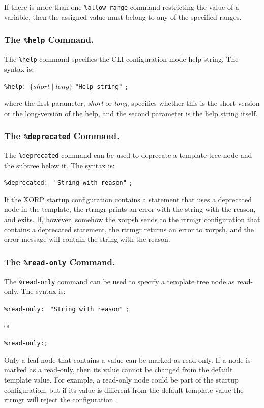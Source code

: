 \documentclass[11pt]{article}
\begin{document}
If there is more than one {\tt \%allow-range} command restricting
the value of a variable, then the assigned value must belong to any
of the specified ranges.

\subsubsection{The {\tt \%help} Command.}

The {\tt \%help} command specifies the CLI configuration-mode help string.
The syntax is:

\texttt{\%help: }{$\{short \mid long\}$} \texttt{"Help string"} \texttt{;}

\noindent where the first parameter, \textit{short} or \textit{long},
specifies whether this is the short-version or the long-version of the
help, and the second parameter is the help string itself.

\subsubsection{The {\tt \%deprecated} Command.}

The {\tt \%deprecated} command can be used to deprecate a template tree
node and the subtree below it.
The syntax is:

\texttt{\%deprecated: } \texttt{"String with reason"} \texttt{;}

If the XORP startup configuration contains a statement that uses a
deprecated node in the template, the rtrmgr prints an error with
the string with the reason, and exits.
If, however, somehow the xorpsh sends to the rtrmgr configuration
that contains a deprecated statement, the rtrmgr returns an error to xorpsh,
and the error message will contain the string with the reason.

\subsubsection{The {\tt \%read-only} Command.}

The {\tt \%read-only} command can be used to specify a template tree
node as read-only.
The syntax is:

\texttt{\%read-only: } \texttt{"String with reason"} \texttt{;}

or

\texttt{\%read-only:;}

Only a leaf node that contains a value can be marked as read-only.
If a node is marked as a read-only, then its value cannot be
changed from the default template value. For example, a read-only
node could be part of the startup configuration, but if its
value is different from the default template value the rtrmgr
will reject the configuration.
\end{document}
